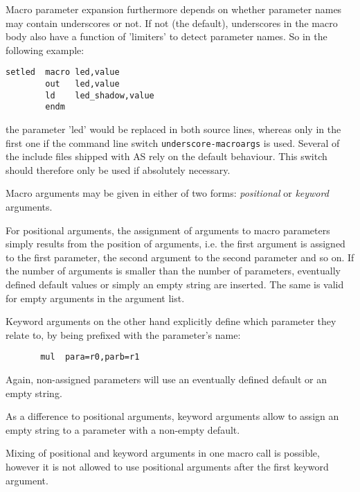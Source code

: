 \documentclass[12pt,twoside]{report}
\newcommand{\tty}[1]{{\tt #1}}
\newcommand{\asname}{{AS}}
\begin{document}
Macro parameter expansion furthermore depends on whether
parameter names may contain underscores or not.  If not
(the default), underscores in the macro body also have
a function of 'limiters' to detect parameter names.  So
in the following example:
\begin{verbatim}
setled  macro led,value
        out   led,value
        ld    led_shadow,value
        endm
\end{verbatim}
the parameter 'led' would be replaced in both source lines, whereas
only in the first one if the command line switch \tty{underscore-macroargs}
is used.  Several of the include files shipped with \asname{}
rely on the default behaviour.  This switch should therefore only
be used if absolutely necessary.

Macro arguments may be given in either of two forms: {\em
positional} or {\em keyword} arguments.

For positional arguments, the assignment of arguments to macro
parameters simply results from the position of arguments, i.e.
the first argument is assigned to the first parameter, the second
argument to the second parameter and so on.  If the number of
arguments is smaller than the number of parameters, eventually
defined default values or simply an empty string are inserted.
The same is valid for empty arguments in the argument list.

Keyword arguments on the other hand explicitly define which
parameter they relate to, by being prefixed with the parameter's
name:
\begin{verbatim}
       mul  para=r0,parb=r1
\end{verbatim}
Again, non-assigned parameters will use an eventually defined
default or an empty string.

As a difference to positional arguments, keyword arguments allow
to assign an empty string to a parameter with a non-empty
default.

Mixing of positional and keyword arguments in one macro call is
possible, however it is not allowed to use positional arguments
after the first keyword argument.
\end{document}
